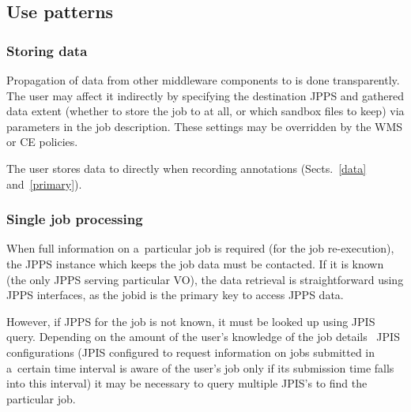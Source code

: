 \subsection{Use patterns}%
\label{jpusage}

\subsubsection{Storing data}
Propagation of data from other middleware components to \JP is done
transparently.
The user may affect it indirectly by 
specifying the destination JPPS and gathered data extent
(\eg whether to store the job to \JP at all, or which sandbox files to keep)
via parameters in the job description. These settings
may be overridden by the WMS or CE policies.

The user stores data to \JP directly when recording annotations
(Sects.~\ref{data} and~\ref{primary}). 

\subsubsection{Single job processing}
When full information on a~particular job is required (\eg for the
job re-execution),
the JPPS instance which keeps the job data must be contacted.
If it is known (\eg the only JPPS serving particular VO), the data retrieval
is straightforward using JPPS interfaces, as the jobid is the primary
key to access JPPS data.

However, if JPPS for the job is not known, it must be looked up
using JPIS query.
Depending on the amount of the user's knowledge of the job details
\wrt\ JPIS configurations (\eg JPIS configured to request information 
on jobs submitted in a~certain time interval is aware of the user's
job only if its submission time falls into this interval)
it may be necessary to query multiple JPIS's to find the particular job.


